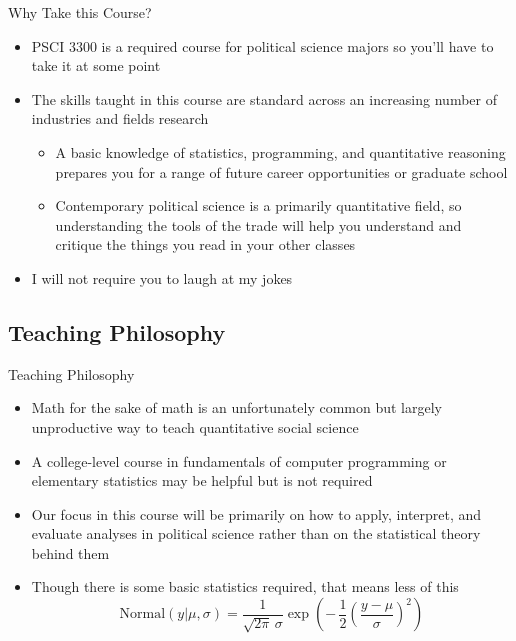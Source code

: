 \documentclass[12pt,ignorenonframetext,aspectratio=169]{beamer}
\begin{document}
\begin{frame}{Why Take this Course?}
\begin{itemize}[<+->]
\item
  PSCI 3300 is a required course for political science majors so you'll
  have to take it at some point
\item
  The skills taught in this course are standard across an increasing
  number of industries and fields research

  \begin{itemize}[<+->]
  \item
    A basic knowledge of statistics, programming, and quantitative
    reasoning prepares you for a range of future career opportunities or
    graduate school
  \item
    Contemporary political science is a primarily quantitative field, so
    understanding the tools of the trade will help you understand and
    critique the things you read in your other classes
  \end{itemize}
\item
  I will not require you to laugh at my jokes
\end{itemize}
\end{frame}

\hypertarget{teaching-philosophy}{%
\subsection{Teaching Philosophy}\label{teaching-philosophy}}

\begin{frame}{Teaching Philosophy}
\begin{itemize}[<+->]
\item
  Math for the sake of math is an unfortunately common but largely
  unproductive way to teach quantitative social science
\item
  A college-level course in fundamentals of computer programming or
  elementary statistics may be helpful but is not required
\item
  Our focus in this course will be primarily on how to apply, interpret,
  and evaluate analyses in political science rather than on the
  statistical theory behind them
\item
  Though there is some basic statistics required, that means less of
  this
  \[\text{Normal}(y|\mu,\sigma) = \frac{1}{\sqrt{2 \pi}\, \sigma} \exp\left( - \, \frac{1}{2}\left(\frac{y -\mu}{\sigma} \right)^2 \right)\]
\end{itemize}
\end{frame}
\end{document}
